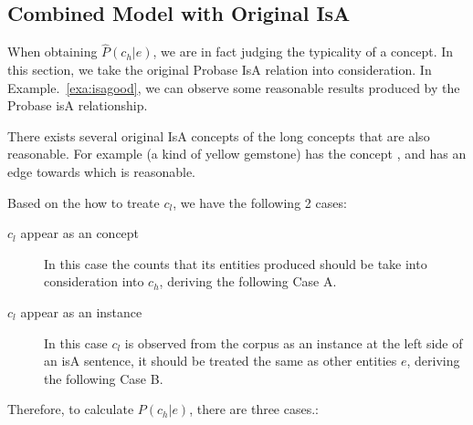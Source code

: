 \subsection{Combined Model with Original IsA}
When obtaining $\hat{P}(c_h|e)$, we are in fact judging the typicality of a concept.
In this section, we take the original Probase IsA relation into consideration. In Example.~\ref{exa:isagood}, we can observe some reasonable results produced by the Probase isA relationship.

\begin{example}
\label{exa:isagood}
  There exists several original IsA concepts of the long concepts that are also reasonable. For example (a kind of yellow gemstone) has the concept , and  has an edge towards  which is reasonable.
\end{example}

Based on the how to treate $c_l$, we have the following 2 cases:

\begin{description}
  \item[$c_l$ appear as an concept] In this case the counts that its entities produced should be take into consideration into $c_h$, deriving the following Case A.
  \item[$c_l$ appear as an instance] In this case $c_l$ is observed from the corpus as an instance at the left side of an isA sentence, it should be treated the same as other entities $e$, deriving the following Case B.
\end{description}


Therefore, to calculate  $P({c_h}|e)$, there are three cases.:

